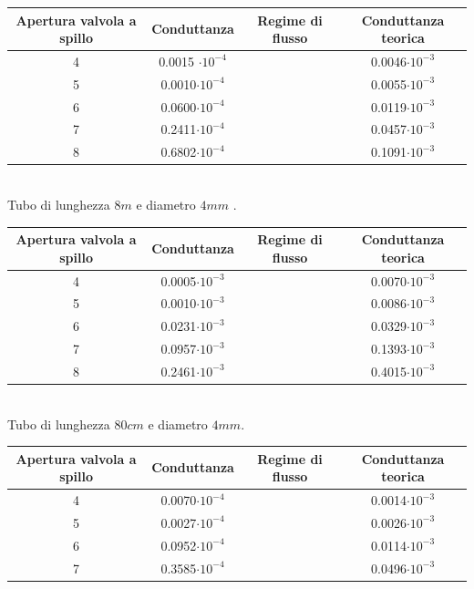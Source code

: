 \documentclass[a4paper,11pt]{article}
\begin{document}
\begin{center} 
\begin{tabular}{|c|c|c|c|}
\hline Apertura valvola a spillo & Conduttanza & Regime di flusso & Conduttanza teorica \\ 
\hline 4 & 0.0015 $\cdot10^{-4}$ &  & 0.0046$\cdot10^{-3}$ \\ 
\hline 5 & 0.0010$\cdot10^{-4}$ &  & 0.0055$\cdot10^{-3}$ \\ 
\hline 6 & 0.0600$\cdot10^{-4}$ &  & 0.0119$\cdot10^{-3}$ \\
\hline 7 & 0.2411$\cdot10^{-4}$ &  & 0.0457$\cdot10^{-3}$ \\
\hline 8 & 0.6802$\cdot10^{-4}$ &  & 0.1091$\cdot10^{-3}$ \\ 
\hline 
\end{tabular}\\
\vspace{5pt}
Tubo di lunghezza $8m$ e diametro $4mm$ .
\\
\vspace{15pt}
\begin{tabular}{|c|c|c|c|}
\hline Apertura valvola a spillo & Conduttanza & Regime di flusso & Conduttanza teorica \\ 
\hline 4 & 0.0005$\cdot10^{-3}$ &  & 0.0070$\cdot10^{-3}$ \\ 
\hline 5 & 0.0010$\cdot10^{-3}$ &  & 0.0086$\cdot10^{-3}$ \\ 
\hline 6 & 0.0231$\cdot10^{-3}$ &  & 0.0329$\cdot10^{-3}$ \\
\hline 7 & 0.0957$\cdot10^{-3}$ &  & 0.1393$\cdot10^{-3}$ \\
\hline 8 & 0.2461$\cdot10^{-3}$ &  & 0.4015$\cdot10^{-3}$ \\ 
\hline 
\end{tabular}\\
\vspace{5pt}
Tubo di lunghezza $80cm$ e diametro $4mm$.
\\
\vspace{15pt}
\begin{tabular}{|c|c|c|c|}
\hline Apertura valvola a spillo & Conduttanza & Regime di flusso & Conduttanza teorica \\ 
\hline 4 & 0.0070$\cdot10^{-4}$ &  & 0.0014$\cdot10^{-3}$ \\ 
\hline 5 & 0.0027$\cdot10^{-4}$ &  & 0.0026$\cdot10^{-3}$ \\ 
\hline 6 & 0.0952$\cdot10^{-4}$ &  & 0.0114$\cdot10^{-3}$\\
\hline 7 & 0.3585$\cdot10^{-4}$ &  & 0.0496$\cdot10^{-3}$ \\

\end{tabular}
\end{center}
\end{document}
